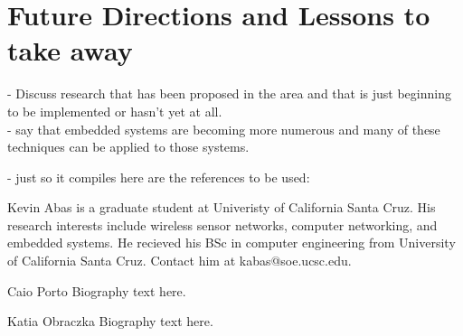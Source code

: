 \documentclass[journal,transmag]{IEEEtran}
\begin{document}
\section{Future Directions and Lessons to take away}
\-- Discuss research that has been proposed in the area and that is just beginning to be implemented or hasn't yet at all.\\
\-- say that embedded systems are becoming more numerous and many of these techniques can be applied to those systems.

\-- just so it compiles here are the references to be used:
~\cite{HuSIMS}
~\cite{Citric}
~\cite{OmniEye}
~\cite{DTNSmartCamera}
~\cite{SensEye}
~\cite{WiFLIP}
~\cite{AccLatEnergy}
~\cite{MeshEye}
~\cite{EnergyCons}
~\cite{Flexi-WVSNP}






{}




\begin{IEEEbiographynophoto}{Kevin Abas}
is a graduate student at Univeristy of California Santa Cruz. His research
interests include wireless sensor networks, computer networking, and embedded
systems. He recieved his BSc in computer engineering from University of
California Santa Cruz. Contact him at kabas@soe.ucsc.edu.
\end{IEEEbiographynophoto}

\begin{IEEEbiographynophoto}{Caio Porto}
Biography text here.
\end{IEEEbiographynophoto}

\begin{IEEEbiographynophoto}{Katia Obraczka}
Biography text here.
\end{IEEEbiographynophoto}
\end{document}
